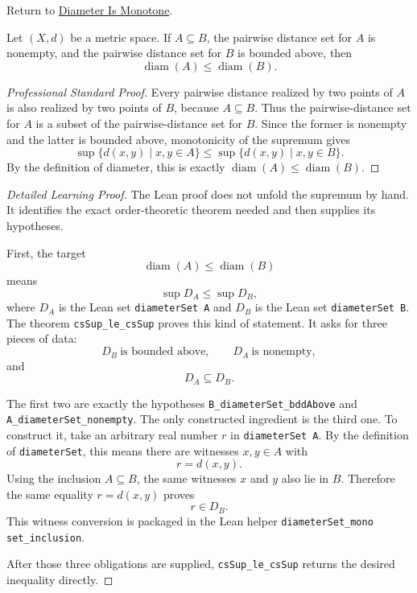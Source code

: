 \newpage
{}
\label{prf:fv-msml-diameter-monotone-under-inclusion}

\begin{remark*}[Return]
Return to \hyperref[thm:fv-msml-diameter-monotone-under-inclusion]{Diameter Is Monotone}.
\end{remark*}

\begin{theorem*}
Let $(X,d)$ be a metric space. If \(A\subseteq B\), the pairwise distance set
for \(A\) is nonempty, and the pairwise distance set for \(B\) is bounded
above, then
\[
  \operatorname{diam}(A)\leq \operatorname{diam}(B).
\]
\end{theorem*}

\begin{proof}[Professional Standard Proof]
\LRAProofBodyStart
Every pairwise distance realized by two points of \(A\) is also realized by
two points of \(B\), because \(A\subseteq B\). Thus the pairwise-distance set
for \(A\) is a subset of the pairwise-distance set for \(B\). Since the former
is nonempty and the latter is bounded above, monotonicity of the supremum gives
\[
  \sup \{d(x,y)\mid x,y\in A\}
  \leq
  \sup \{d(x,y)\mid x,y\in B\}.
\]
By the definition of diameter, this is exactly
\(\operatorname{diam}(A)\leq\operatorname{diam}(B)\).
\end{proof}

\begin{proof}[Detailed Learning Proof]
\LRAProofBodyStart
The Lean proof does not unfold the supremum by hand. It identifies the exact
order-theoretic theorem needed and then supplies its hypotheses.

First, the target
\[
  \operatorname{diam}(A)\leq \operatorname{diam}(B)
\]
means
\[
  \sup D_A
  \leq
  \sup D_B,
\]
where \(D_A\) is the Lean set \texttt{diameterSet A} and \(D_B\) is the Lean
set \texttt{diameterSet B}.
The theorem \texttt{csSup\_le\_csSup} proves this kind of statement. It asks
for three pieces of data:
\[
  D_B\ \text{is bounded above},\qquad
  D_A\ \text{is nonempty},
\]
and
\[
  D_A\subseteq D_B.
\]

The first two are exactly the hypotheses
\texttt{B\_diameterSet\_bddAbove} and
\texttt{A\_diameterSet\_nonempty}. The only constructed ingredient is the
third one. To construct it, take an arbitrary real number \(r\) in
\texttt{diameterSet A}. By the definition of \texttt{diameterSet}, this means
there are witnesses \(x,y\in A\) with
\[
  r=d(x,y).
\]
Using the inclusion \(A\subseteq B\), the same witnesses \(x\) and \(y\) also
lie in \(B\). Therefore the same equality \(r=d(x,y)\) proves
\[
  r\in D_B.
\]
This witness conversion is packaged in the Lean helper
\texttt{diameterSet\_mono set\_inclusion}.

After those three obligations are supplied, \texttt{csSup\_le\_csSup}
returns the desired inequality directly.
\end{proof}


